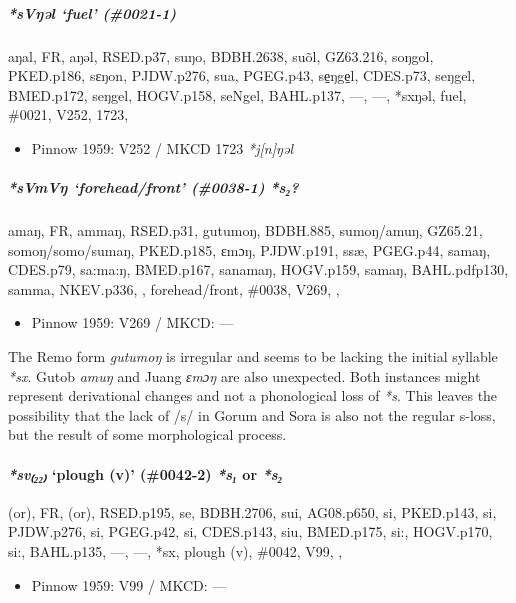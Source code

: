 \documentclass[a4paper,]{article}
\providecommand{\tightlist}{%
  \setlength{\itemsep}{0pt}\setlength{\parskip}{0pt}}
\let\oldparagraph\paragraph
\renewcommand{\paragraph}[1]{\oldparagraph{#1}\mbox{}}
\let\oldsubparagraph\subparagraph
\renewcommand{\subparagraph}[1]{\oldsubparagraph{#1}\mbox{}}
\begin{document}
\subparagraph{\texorpdfstring{\emph{*sVŋəl} `fuel'
(\#0021-1)}{*sVŋəl fuel (\#0021-1)}}\label{svux14bux259l-fuel-0021-1}

aŋal, FR, aŋəl, RSED.p37, suŋo, BDBH.2638, suõl, GZ63.216, soŋgol,
PKED.p186, sɛŋon, PJDW.p276, sua, PGEG.p43, se̠ŋge̠l, CDES.p73, seŋgel,
BMED.p172, seŋgel, HOGV.p158, seNgel, BAHL.p137, ---, ---, *sxŋəl, fuel,
\#0021, V252, 1723,

\begin{itemize}
\tightlist
\item
  Pinnow 1959: V252 / MKCD 1723 \emph{*j{[}n{]}ŋəl}
\end{itemize}

\subparagraph{\texorpdfstring{\emph{*sVmVŋ} `forehead/front' (\#0038-1)
\emph{*s₂}?}{*sVmVŋ forehead/front (\#0038-1) *s₂?}}\label{svmvux14b-foreheadfront-0038-1-s}

amaŋ, FR, ammaŋ, RSED.p31, gutumoŋ, BDBH.885, sumoŋ/amuŋ, GZ65.21,
somoŋ/somo/sumaŋ, PKED.p185, ɛmɔŋ, PJDW.p191, ssæ, PGEG.p44, samaŋ,
CDES.p79, sa:ma:ŋ, BMED.p167, sanamaŋ, HOGV.p159, samaŋ, BAHL.pdfp130,
samma, NKEV.p336, , forehead/front, \#0038, V269, ,

\begin{itemize}
\tightlist
\item
  Pinnow 1959: V269 / MKCD: ---
\end{itemize}

The Remo form \emph{gutumoŋ} is irregular and seems to be lacking the
initial syllable \emph{*sx}. Gutob \emph{amuŋ} and Juang \emph{ɛmɔŋ} are
also unexpected. Both instances might represent derivational changes and
not a phonological loss of \emph{*s}. This leaves the possibility that
the lack of /s/ in Gorum and Sora is also not the regular s-loss, but
the result of some morphological process.

\paragraph{\texorpdfstring{\emph{*sv₍₂₂₎} `plough (v)' (\#0042-2)
\emph{*s₁} or
\emph{*s₂}}{*sv₍₂₂₎ plough (v) (\#0042-2) *s₁ or *s₂}}\label{sv-plough-v-0042-2-s-or-s}

(or), FR, (or), RSED.p195, se, BDBH.2706, sui, AG08.p650, si, PKED.p143,
si, PJDW.p276, si, PGEG.p42, si, CDES.p143, siu, BMED.p175, si:,
HOGV.p170, si:, BAHL.p135, ---, ---, *sx, plough (v), \#0042, V99, ,

\begin{itemize}
\tightlist
\item
  Pinnow 1959: V99 / MKCD: ---
\end{itemize}
\end{document}
